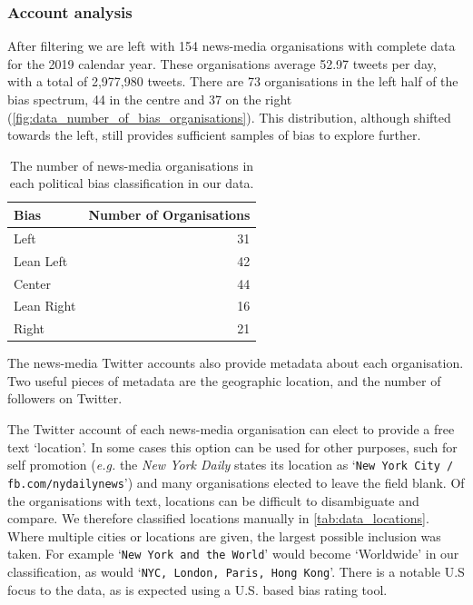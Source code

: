 
\subsubsection{Account analysis}
After filtering we are left with 154 news-media organisations with complete data for the 2019 calendar year. %
These organisations average 52.97 tweets per day, with a total of 2,977,980 tweets.
There are 73 organisations in the left half of the bias spectrum, 44 in the centre and 37 on the right (\autoref{fig:data_number_of_bias_organisations}). This distribution, although shifted towards the left, still provides sufficient samples of bias to explore further.

\begin{table}[!htbp]
	\centering
	\begin{tabular}{lr}
		\toprule
		Bias &   Number of Organisations \\
		\midrule
		{\color{Left} Left }&  31 \\
		{\color{LeanLeft} Lean Left }&  42 \\
		{\color{Center} Center }&  44 \\
		{\color{LeanRight} Lean Right }&  16 \\
		{\color{Right} Right }&  21 \\
		\bottomrule
	\end{tabular}
	\caption{The number of news-media organisations in each political bias classification in our data.}
	\label{fig:data_number_of_bias_organisations}
\end{table}

The news-media Twitter accounts also provide metadata about each organisation. Two useful pieces of metadata are the geographic location, and the number of followers on Twitter.

The Twitter account of each news-media organisation can elect to provide a free text `location'. In some cases this option can be used for other purposes, such for self promotion (\emph{e.g.} the \emph{New York Daily} states its location as `\texttt{New York City  /  fb.com/nydailynews}') and many organisations elected to leave the field blank. 
Of the organisations with text, locations can be difficult to disambiguate and compare. We therefore classified locations manually in \autoref{tab:data_locations}. Where multiple cities or locations are given, the largest possible inclusion was taken. For example `\texttt{New York and the World}' would become `Worldwide' in our classification, as would `\texttt{NYC, London, Paris, Hong Kong}'. There is a notable U.S focus to the data, as is expected using a U.S. based bias rating tool.

